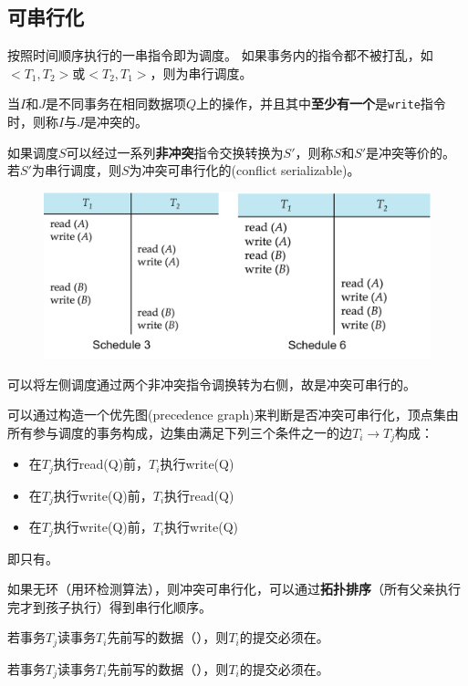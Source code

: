 \subsection{可串行化}
\begin{definition}[调度]
按照时间顺序执行的一串指令即为调度。
如果事务内的指令都不被打乱，如$<T_1,T_2>$或$<T_2,T_1>$，则为串行调度。
\end{definition}
\begin{definition}[冲突]
当$I$和$J$是不同事务在相同数据项$Q$上的操作，并且其中\textbf{至少有一个}是\verb'write'指令时，则称$I$与$J$是冲突的。
\end{definition}
\begin{definition}
如果调度$S$可以经过一系列\textbf{非冲突}指令交换转换为$S'$，则称$S$和$S'$是冲突等价的。
若$S'$为串行调度，则$S$为冲突可串行化的(conflict serializable)。
\end{definition}
\begin{figure}[H]
\centering
\includegraphics[width=0.8\linewidth]{fig/conflict_serializability.png}
\end{figure}
可以将左侧调度通过两个非冲突指令调换转为右侧，故是冲突可串行的。

可以通过构造一个优先图(precedence graph)来判断是否冲突可串行化，顶点集由所有参与调度的事务构成，边集由满足下列三个条件之一的边$T_i\to T_j$构成：
\begin{itemize}
	\item 在$T_j$执行read(Q)前，$T_i$执行write(Q)
	\item 在$T_j$执行write(Q)前，$T_i$执行read(Q)
	\item 在$T_j$执行write(Q)前，$T_i$执行write(Q)
\end{itemize}
即只有。

如果无环（用环检测算法），则冲突可串行化，可以通过\textbf{拓扑排序}（所有父亲执行完才到孩子执行）得到串行化顺序。

\begin{definition}[可恢复调度]
若事务$T_j$读事务$T_i$先前写的数据（），则$T_i$的提交必须在。
\end{definition}
\begin{definition}
若事务$T_j$读事务$T_i$先前写的数据（），则$T_i$的提交必须在。
\end{definition}


